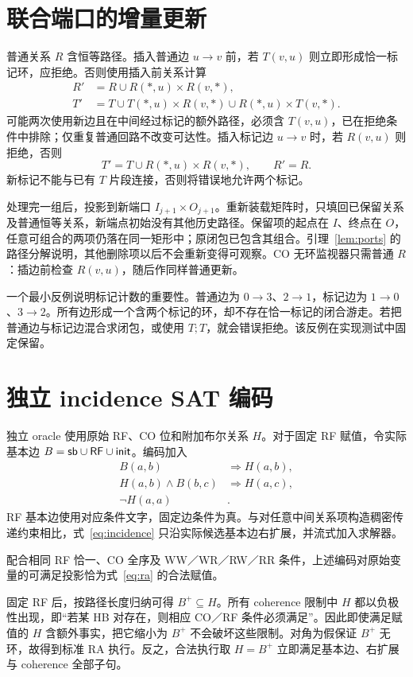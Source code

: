 \section{联合端口的增量更新}\label{app:update}
普通关系 $R$ 含恒等路径。插入普通边 $u\to v$ 前，若 $T(v,u)$ 则立即形成恰一标记环，应拒绝。否则使用插入前关系计算
\begin{align}
R'&=R\cup R(*,u)\times R(v,*),\\
T'&=T\cup T(*,u)\times R(v,*)
        \cup R(*,u)\times T(v,*).
\end{align}
可能两次使用新边且在中间经过标记的额外路径，必须含 $T(v,u)$，已在拒绝条件中排除；仅重复普通回路不改变可达性。插入标记边 $u\to v$ 时，若 $R(v,u)$ 则拒绝，否则
\[
 T'=T\cup R(*,u)\times R(v,*),\qquad R'=R.
\]
新标记不能与已有 $T$ 片段连接，否则将错误地允许两个标记。

处理完一组后，投影到新端口 $I_{j+1}\times O_{j+1}$。重新装载矩阵时，只填回已保留关系及普通恒等关系，新端点初始没有其他历史路径。保留项的起点在 $I$、终点在 $O$，任意可组合的两项仍落在同一矩形中；原闭包已包含其组合。引理~\ref{lem:ports} 的路径分解说明，其他删除项以后不会重新变得可观察。CO 无环监视器只需普通 $R$：插边前检查 $R(v,u)$，随后作同样普通更新。

一个最小反例说明标记计数的重要性。普通边为 $0\to3$、$2\to1$，标记边为 $1\to0$、$3\to2$。所有边形成一个含两个标记的环，却不存在恰一标记的闭合游走。若把普通边与标记边混合求闭包，或使用 $T;T$，就会错误拒绝。该反例在实现测试中固定保留。

\section{独立 incidence SAT 编码}\label{app:oracle}
独立 oracle 使用原始 RF、CO 位和附加布尔关系 $H$。对于固定 RF 赋值，令实际基本边 $B=\mathsf{sb}\cup\mathsf{RF}\cup\mathsf{init}$。编码加入
\begin{align}
 B(a,b)&\Rightarrow H(a,b),\\
 H(a,b)\land B(b,c)&\Rightarrow H(a,c),\label{eq:incidence}\\
 \neg H(a,a)&.
\end{align}
RF 基本边使用对应条件文字，固定边条件为真。与对任意中间关系项构造稠密传递约束相比，式~\eqref{eq:incidence} 只沿实际候选基本边右扩展，并流式加入求解器。

\begin{clemma}
配合相同 RF 恰一、CO 全序及 WW／WR／RW／RR 条件，上述编码对原始变量的可满足投影恰为式~\eqref{eq:ra} 的合法赋值。
\end{clemma}
\begin{cproof}
固定 RF 后，按路径长度归纳可得 $B^+\subseteq H$。所有 coherence 限制中 $H$ 都以负极性出现，即“若某 HB 对存在，则相应 CO／RF 条件必须满足”。因此即使满足赋值的 $H$ 含额外事实，把它缩小为 $B^+$ 不会破坏这些限制。对角为假保证 $B^+$ 无环，故得到标准 RA 执行。反之，合法执行取 $H=B^+$ 立即满足基本边、右扩展与 coherence 全部子句。
\end{cproof}

